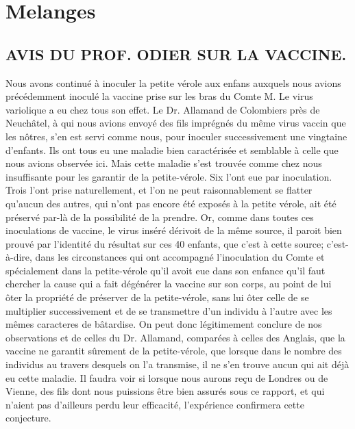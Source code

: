 \setcounter{page}{98}
\chapter{Melanges}
\section{AVIS DU PROF. ODIER SUR LA VACCINE.}
Nous avons continué à inoculer la petite vérole aux enfans auxquels nous avions précédemment inoculé la vaccine prise sur les bras du Comte M. Le virus variolique a eu chez tous son effet. Le Dr. Allamand de Colombiers près de Neuchâtel, à qui nous avions envoyé des fils imprégnés du même\setcounter{page}{99} virus vaccin que les nôtres, s'en est servi comme nous, pour inoculer successivement une vingtaine d'enfants. Ils ont tous eu une maladie bien caractérisée et semblable à celle que nous avions observée ici.
Mais cette maladie s'est trouvée comme chez nous insuffisante pour les garantir de la petite-vérole. Six l'ont eue par inoculation. Trois l'ont prise naturellement, et l'on ne peut raisonnablement se flatter qu'aucun des autres, qui n'ont pas encore été exposés à la petite vérole, ait été préservé par-là de la possibilité de la prendre.
Or, comme dans toutes ces inoculations de vaccine, le virus inséré dérivoit de la même source, il paroit bien prouvé par l'identité du résultat sur ces 40 enfants, que c'est à cette source; c'est-à-dire, dans les circonstances qui ont accompagné l'inoculation du Comte et spécialement dans la petite-vérole qu'il avoit eue dans son enfance qu'il faut chercher la cause qui a fait dégénérer la vaccine sur son corps, au point de lui ôter la propriété de préserver de la petite-vérole, sans lui ôter celle de se multiplier successivement et\setcounter{page}{100} de se transmettre d'un individu à l'autre avec les mêmes caracteres de bâtardise. On peut donc légitimement conclure de nos observations et de celles du Dr. Allamand, comparées à celles des Anglais, que la vaccine ne garantit sûrement de la petite-vérole, que lorsque dans le nombre des individus au travers desquels on l'a transmise, il ne s'en trouve aucun qui ait déjà eu cette maladie. Il faudra voir si lorsque nous aurons reçu de Londres ou de Vienne, des fils dont nous puissions être bien assurés sous ce rapport, et qui n'aient pas d'ailleurs perdu leur efficacité, l'expérience confirmera cette conjecture.

